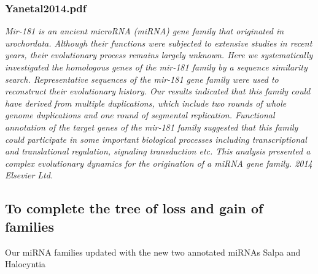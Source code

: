 \documentclass[graybox]{svmult}
\begin{document}
\subsubsection{Yanetal2014.pdf}


\cite{Yang2014}
\textit{Mir-181 is an ancient microRNA (miRNA) gene family that originated in urochordata. Although their functions were subjected to extensive studies in recent years, their evolutionary process remains largely unknown. Here we systematically investigated the homologous genes of the mir-181 family by a sequence similarity search. Representative sequences of the mir-181 gene family were used to reconstruct their evolutionary history. Our results indicated that this family could have derived from multiple duplications, which include two rounds of whole genome duplications and one round of segmental replication. Functional annotation of the target genes of the mir-181 family suggested that this family could participate in some important biological processes including transcriptional and translational regulation, signaling transduction etc. This analysis presented a complex evolutionary dynamics for the origination of a miRNA gene family. {\textcopyright} 2014 Elsevier Ltd.}


\subsection{To complete the tree of loss and gain of families}

Our miRNA families updated with the new two annotated miRNAs Salpa and Halocyntia
\end{document}
